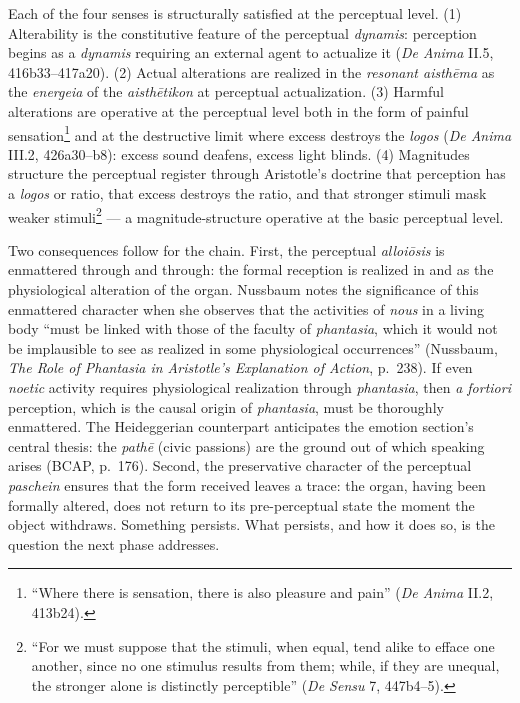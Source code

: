 \documentclass{article}
\begin{document}
Each of the four senses is structurally satisfied at the perceptual level. (1) Alterability is the constitutive feature of the perceptual \textit{dynamis}: perception begins as a \textit{dynamis} requiring an external agent to actualize it (\textit{De Anima} II.5, 416b33--417a20). (2) Actual alterations are realized in the \textit{resonant aisthēma} as the \textit{energeia} of the \textit{aisthētikon} at perceptual actualization. (3) Harmful alterations are operative at the perceptual level both in the form of painful sensation\footnote{``Where there is sensation, there is also pleasure and pain'' (\textit{De Anima} II.2, 413b24).} and at the destructive limit where excess destroys the \textit{logos} (\textit{De Anima} III.2, 426a30--b8): excess sound deafens, excess light blinds. (4) Magnitudes structure the perceptual register through Aristotle's doctrine that perception has a \textit{logos} or ratio, that excess destroys the ratio, and that stronger stimuli mask weaker stimuli\footnote{``For we must suppose that the stimuli, when equal, tend alike to efface one another, since no one stimulus results from them; while, if they are unequal, the stronger alone is distinctly perceptible'' (\textit{De Sensu} 7, 447b4--5).} --- a magnitude-structure operative at the basic perceptual level.

Two consequences follow for the chain. First, the perceptual \textit{alloiōsis} is enmattered through and through: the formal reception is realized in and as the physiological alteration of the organ. Nussbaum notes the significance of this enmattered character when she observes that the activities of \textit{nous} in a living body ``must be linked with those of the faculty of \textit{phantasia}, which it would not be implausible to see as realized in some physiological occurrences'' (Nussbaum, \textit{The Role of Phantasia in Aristotle's Explanation of Action}, p.~238). If even \textit{noetic} activity requires physiological realization through \textit{phantasia}, then \textit{a fortiori} perception, which is the causal origin of \textit{phantasia}, must be thoroughly enmattered. The Heideggerian counterpart anticipates the emotion section's central thesis: the \textit{pathē} (civic passions) are the ground out of which speaking arises (BCAP, p.~176). Second, the preservative character of the perceptual \textit{paschein} ensures that the form received leaves a trace: the organ, having been formally altered, does not return to its pre-perceptual state the moment the object withdraws. Something persists. What persists, and how it does so, is the question the next phase addresses.
\end{document}
